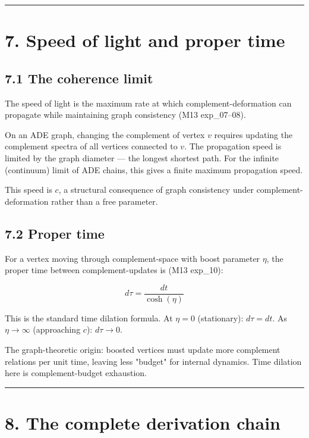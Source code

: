\documentclass[11pt,a4paper]{article}
\begin{document}
\begin{center}\rule{0.5\linewidth}{0.4pt}\end{center}

\section*{7. Speed of light and proper time}

\subsection*{7.1 The coherence limit}

The speed of light is the maximum rate at which complement-deformation can propagate while maintaining graph consistency (M13 exp\_07–08).

On an ADE graph, changing the complement of vertex $v$ requires updating the complement spectra of all vertices connected to $v$. The propagation speed is limited by the graph diameter — the longest shortest path. For the infinite (continuum) limit of ADE chains, this gives a finite maximum propagation speed.

This speed is $c$, a structural consequence of graph consistency under complement-deformation rather than a free parameter.

\subsection*{7.2 Proper time}

For a vertex moving through complement-space with boost parameter $\eta$, the proper time between complement-updates is (M13 exp\_10):

\[d\tau = \frac{dt}{\cosh(\eta)}\]

This is the standard time dilation formula. At $\eta = 0$ (stationary): $d\tau = dt$. As $\eta \to \infty$ (approaching $c$): $d\tau \to 0$.

The graph-theoretic origin: boosted vertices must update more complement relations per unit time, leaving less "budget" for internal dynamics. Time dilation here is complement-budget exhaustion.

\begin{center}\rule{0.5\linewidth}{0.4pt}\end{center}

\section*{8. The complete derivation chain}
\end{document}

